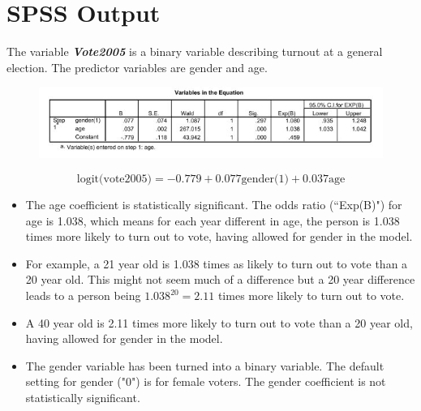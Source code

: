 \documentclass[a4paper,12pt]{article}
\begin{document}
\section*{SPSS Output}
The variable \textbf{\textit{Vote2005}} is a binary variable describing turnout at a general election. The predictor variables are gender and age.
\begin{center}
	\begin{figure}[h!]
		\includegraphics[scale=0.8]{images/LogWeek10B.jpg}\\
	\end{figure}
\end{center}
\vspace{-1.7cm}
\[\mbox{logit(vote2005)} = -0.779 + 0.077\mbox{gender(1)}+0.037\mbox{age}\]
\begin{itemize}
	\item The age coefficient is statistically significant. The odds ratio (``Exp(B)") for age is 1.038, which
	means for each year different in age, the person is 1.038 times more likely to turn
	out to vote, having allowed for gender in the model. 
	\item For example, a 21 year old is 1.038
	times as likely to turn out to vote than a 20 year old. This might not seem much
	of a difference but a 20 year difference leads to a person being $1.038^20 = 2.11$
	times more likely to turn out to vote. 
	\item  A 40 year old is 2.11 times more likely to
	turn out to vote than a 20 year old, having allowed for gender in the model.
	\item The gender variable has been turned into a binary variable. The default setting for gender ("0") is for female voters. The gender coefficient is not statistically significant. 
\end{itemize}
\end{document}
